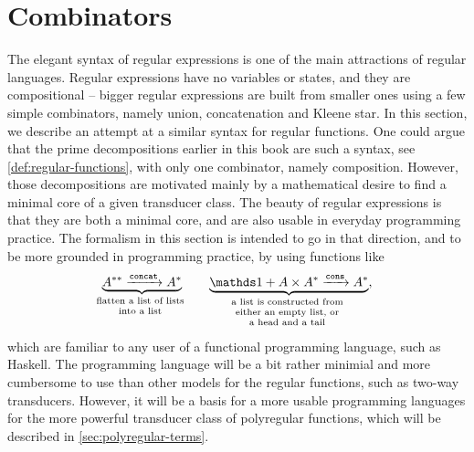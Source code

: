 \section{Combinators}
\label{sec:regular-list-functions}

The elegant syntax of regular expressions is one of the main attractions of regular languages. Regular expressions have no variables or states, and they are compositional -- bigger regular expressions are built from smaller ones using a few simple combinators, namely union, concatenation and Kleene star. In this section, we describe an attempt at a similar syntax for regular functions. One could argue that the prime decompositions earlier in this book are such a syntax, see \cref{def:regular-functions}, with only one combinator, namely composition. However, those decompositions are motivated mainly by a mathematical desire to find a  minimal core of a given transducer class. The beauty of regular expressions is that they are both a minimal core, and are also  usable in everyday programming practice. The formalism in this section is intended to go in that direction, and to be more grounded in programming practice, by using  functions like 
\begin{align*}
 \myunderbrace{A^{**} \xrightarrow {\concatterm} A^*}{flatten a list of lists \\ into a list} \qquad \myunderbrace{\onetype + A \times A^* \xrightarrow {\consterm} A^*}{a list is constructed from \\ either an empty list, or \\ a head and a tail},
\end{align*}
which are familiar to any user of a functional programming language, such as  Haskell. The programming language will be a bit rather minimial and more cumbersome to use than other models for the regular functions, such as two-way transducers.  However, it will be a  basis for a  more usable programming  languages for the more powerful transducer class of  polyregular functions, which will be described in \cref{sec:polyregular-terms}. 

